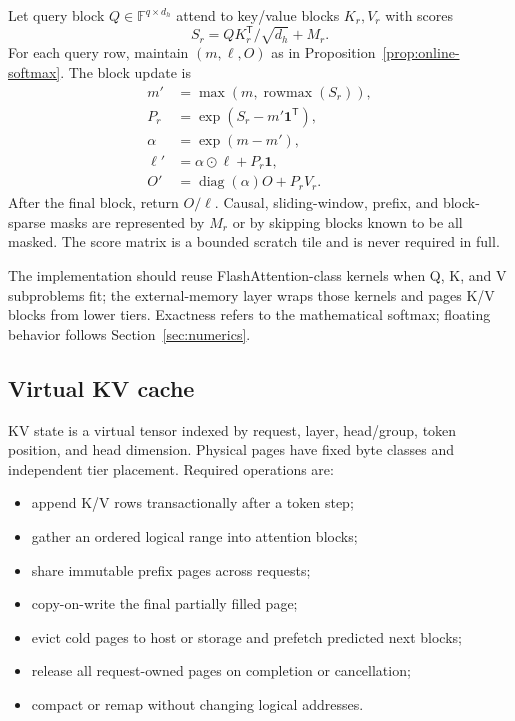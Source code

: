 Let query block $Q\in\mathbb F^{q\times d_h}$ attend to key/value blocks $K_r,V_r$ with scores
\[
  S_r=QK_r^{\mathsf T}/\sqrt{d_h}+M_r.
\]
For each query row, maintain $(m,\ell,O)$ as in Proposition~\ref{prop:online-softmax}. The block update is
\begin{align}
  m' &= \max\left(m,\operatorname{rowmax}(S_r)\right),\\
  P_r &= \exp(S_r-m'\mathbf 1^{\mathsf T}),\\
  \alpha &= \exp(m-m'),\\
  \ell' &= \alpha\odot\ell+P_r\mathbf 1,\\
  O' &= \operatorname{diag}(\alpha)O+P_rV_r.
\end{align}
After the final block, return $O/\ell$. Causal, sliding-window, prefix, and block-sparse masks are represented by $M_r$ or by skipping blocks known to be all masked. The score matrix is a bounded scratch tile and is never required in full.

The implementation should reuse FlashAttention-class kernels when Q, K, and V subproblems fit; the external-memory layer wraps those kernels and pages K/V blocks from lower tiers. Exactness refers to the mathematical softmax; floating behavior follows Section~\ref{sec:numerics}.

\subsection{Virtual KV cache}

KV state is a virtual tensor indexed by request, layer, head/group, token position, and head dimension. Physical pages have fixed byte classes and independent tier placement. Required operations are:

\begin{itemize}
  \item append K/V rows transactionally after a token step;
  \item gather an ordered logical range into attention blocks;
  \item share immutable prefix pages across requests;
  \item copy-on-write the final partially filled page;
  \item evict cold pages to host or storage and prefetch predicted next blocks;
  \item release all request-owned pages on completion or cancellation;
  \item compact or remap without changing logical addresses.
\end{itemize}

